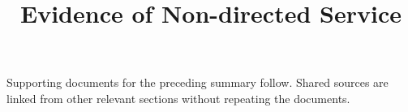 \title{Evidence of Non-directed Service}
\portfoliotitle
Supporting documents for the preceding summary follow. Shared sources are linked from other relevant sections without repeating the documents.

